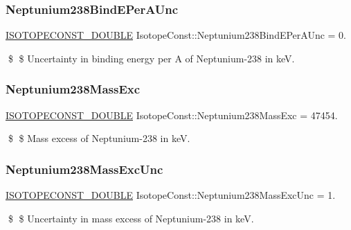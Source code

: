 \subsubsection{\texorpdfstring{Neptunium238\+Bind\+E\+Per\+A\+Unc}{Neptunium238BindEPerAUnc}}
{\footnotesize\ttfamily \mbox{\hyperlink{group___isotope_const-_macros_ga8f45a7272ce02c0b4c65c44636ed719a}{I\+S\+O\+T\+O\+P\+E\+C\+O\+N\+S\+T\+\_\+\+D\+O\+U\+B\+LE}} Isotope\+Const\+::\+Neptunium238\+Bind\+E\+Per\+A\+Unc = 0.}

\$ \$ Uncertainty in binding energy per A of Neptunium-\/238 in keV. \mbox{\label{group___isotope_const-_neptunium-_np238_ga550bfb467dedf3e8d109753294b21d4c}} 
\subsubsection{\texorpdfstring{Neptunium238\+Mass\+Exc}{Neptunium238MassExc}}
{\footnotesize\ttfamily \mbox{\hyperlink{group___isotope_const-_macros_ga8f45a7272ce02c0b4c65c44636ed719a}{I\+S\+O\+T\+O\+P\+E\+C\+O\+N\+S\+T\+\_\+\+D\+O\+U\+B\+LE}} Isotope\+Const\+::\+Neptunium238\+Mass\+Exc = 47454.}

\$ \$ Mass excess of Neptunium-\/238 in keV. \mbox{\label{group___isotope_const-_neptunium-_np238_ga5479adbac34537c7f4daefac033cbf60}} 
\subsubsection{\texorpdfstring{Neptunium238\+Mass\+Exc\+Unc}{Neptunium238MassExcUnc}}
{\footnotesize\ttfamily \mbox{\hyperlink{group___isotope_const-_macros_ga8f45a7272ce02c0b4c65c44636ed719a}{I\+S\+O\+T\+O\+P\+E\+C\+O\+N\+S\+T\+\_\+\+D\+O\+U\+B\+LE}} Isotope\+Const\+::\+Neptunium238\+Mass\+Exc\+Unc = 1.}

\$ \$ Uncertainty in mass excess of Neptunium-\/238 in keV. \mbox{\label{group___isotope_const-_neptunium-_np238_ga6d82f556c4b34036d590b88396ac1fb8}} 
